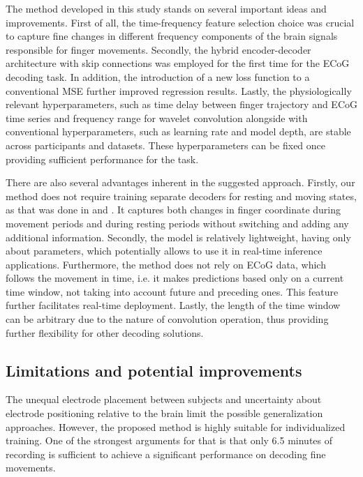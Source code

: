 \documentclass[letterpaper]{article} \usepackage{aaai22}  \usepackage{times}  \usepackage{helvet}  \usepackage{courier}  \usepackage[hyphens]{url}  \usepackage{graphicx} \urlstyle{rm} \def\UrlFont{\rm}  \usepackage{natbib}  \usepackage{caption} \DeclareCaptionStyle{ruled}{labelfont=normalfont,labelsep=colon,strut=off} \frenchspacing  \setlength{\pdfpagewidth}{8.5in}  \setlength{\pdfpageheight}{11in}  \usepackage{algorithm}
\begin{document}
The method developed in this study stands on several important ideas and improvements. First of all, the time-frequency feature selection choice was crucial to capture fine changes in different frequency components of the brain signals responsible for finger movements. Secondly, the hybrid encoder-decoder architecture with skip connections was employed for the first time for the ECoG decoding task. In addition, the introduction of a new loss function to a conventional MSE further improved regression results. Lastly, the physiologically relevant hyperparameters, such as time delay between finger trajectory and ECoG time series and frequency range for wavelet convolution alongside with conventional hyperparameters, such as learning rate and model depth, are stable across participants and datasets. These hyperparameters can be fixed once providing sufficient performance for the task.  

There are also several advantages inherent in the suggested approach. Firstly, our method does not require training separate decoders for resting and moving states, as that was done in \citet{elgharabawy2016} and \citet{flamary2012}. It captures both changes in finger coordinate during movement periods and during resting periods without switching and adding any additional information. Secondly, the model is relatively lightweight, having only about  parameters, which potentially allows to use it in real-time inference applications. Furthermore, the method does not rely on ECoG data, which follows the movement in time, i.e. it makes predictions based only on a current time window, not taking into account future and preceding ones. This feature further facilitates real-time deployment. Lastly, the length of the time window can be arbitrary due to the nature of convolution operation, thus providing further flexibility for other decoding solutions. 

\subsection{Limitations and potential improvements}

The unequal electrode placement between subjects and uncertainty about electrode positioning relative to the brain limit the possible generalization approaches. However, the proposed method is highly suitable for individualized training. One of the strongest arguments for that is that only 6.5 minutes of recording is sufficient to achieve a significant performance on decoding fine movements. 
\end{document}
